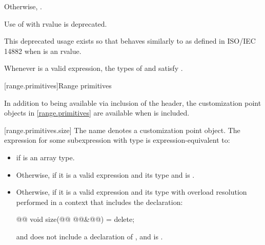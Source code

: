 {\begin{itemize}
{\color{newclr}
\item Otherwise, .
} %
\end{itemize}

{\color{oldclr}
\pnum
Use of  with rvalue  is deprecated.
\begin{note}
This deprecated usage exists so that 
behaves similarly to  as defined in ISO/IEC 14882 when
 is an rvalue.
\end{note}
} %

\pnum
\begin{note}
Whenever  is a valid expression, the
types of  and  satisfy
.
\end{note}

[range.primitives]{Range primitives}

\pnum
In addition to being available via inclusion of the
header, the customization point objects in \ref{range.primitives} are
available when  is included.

[range.primitives.size]{}
\pnum
The name  denotes a customization point
object. The expression
 for some subexpression  with type
 is expression-equivalent to:

\begin{itemize}
\item
   if  is an array
  type.

\item
  Otherwise, 
  if it is a valid expression and its type  
    and
   is
  .

\item
  Otherwise, 
  if it is a valid expression and its type  
    with overload resolution
  performed in a context that includes the declaration:
  \begin{codeblock}
  @@ void size(@@ @@&@\newtxt{\&}@) = delete;
  \end{codeblock}
  and does not include a declaration of , and
   is .


\end{itemize}}
